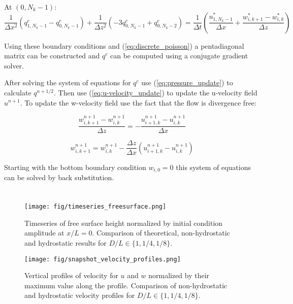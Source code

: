 \documentclass[12pt]{article}
\begin{document}
At $(0,N_k-1)$:
\begin{equation*}
\frac{1}{\Delta x^2} (q_{1,N_k-1}^c -  q_{0,N_k-1}^c ) 
+ \frac{1}{\Delta z^2} (-3 q_{0,N_k-1}^c + q_{0,N_k-2}^c) = \frac{1}{\Delta t} \left( \frac{u_{1,N_k-1}^* }{\Delta x}  + \frac{w_{i,k+1}^* - w_{i,k}^*}{\Delta z}\right)
\end{equation*}

Using these boundary conditions and (\ref{eq:discrete_poisson}) a pentadiagonal matrix can be constructed and $q^c$ can be computed using a conjugate gradient solver.

After solving the system of equations for $q^c$ use (\ref{eq:pressure_update}) to calculate $q^{n+1/2}$. Then use (\ref{eq:u-velocity_update}) to update the u-velocity field $u^{n+1}$. To update the w-velocity field use the fact that the flow is divergence free:

\begin{equation*}
\frac{w_{i,k+1}^{n+1} - w_{i,k}^{n+1}}{\Delta z} = - \frac{u_{i+1,k}^{n+1} - u_{i,k}^{n+1}}{\Delta x}
\end{equation*}

\begin{equation*}
w_{i,k+1}^{n+1} = w_{i,k}^{n+1} - \frac{\Delta z}{\Delta x} (u_{i+1,k}^{n+1} - u_{i,k}^{n+1})
\end{equation*}

Starting with the bottom boundary condition $w_{i,0} = 0$ this system of equations can be solved by back substitution.

\section{}

	\begin{figure}[htb]
		\begin{center}
			\texttt{[image: fig/timeseries\_freesurface.png]}
			\caption{Timeseries of free surface height normalized by initial condition amplitude at $x/L=0$. Comparison of theoretical, non-hydrostatic and hydrostatic results for $D/L \in \{1, 1/4, 1/8\}$.}
			\label{fig:timeseries_freesurface}
		\end{center}
	\end{figure}

	\begin{figure}[htb]
		\begin{center}
			\texttt{[image: fig/snapshot\_velocity\_profiles.png]}
			\caption{Vertical profiles of velocity for $u$ and $w$ normalized by their maximum value along the profile. Comparison of non-hydrostatic and hydrostatic velocity profiles for $D/L \in \{1, 1/4, 1/8\}$.}
			\label{fig:snapshot_velocity_profiles}
		\end{center}
	\end{figure}
\end{document}
